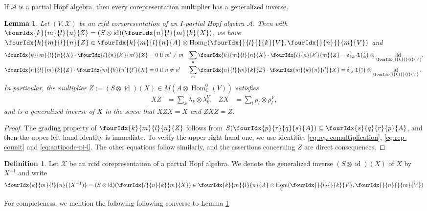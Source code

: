 \documentclass[10pt]{article}
\DeclareMathOperator{\id}{id}
\DeclareMathOperator{\Hom}{Hom}
\newcommand{\C}{\mathbb{C}}
\newcommand{\Grt}[3]{#1{\tiny {\begin{pmatrix} #2\\#3\end{pmatrix}}}}
\newcommand{\UnitC}[2]{\Grt{\mathbf{1}}{#1}{#2}}
\newcommand{\Gr}[5]{\fourIdx{#2}{#4}{#3}{#5}{#1}}%
\newcommand{\Gru}[3]{\Gr{#1}{}{}{#2}{#3}}
\newtheorem{Lem}[Theorem]{Lemma}
\theoremstyle{definition}
\newtheorem{Def}[Theorem]{Definition}
\numberwithin{equation}{section}
\begin{document}
If $\mathscr{A}$ is a partial Hopf algebra,  then every
corepresentation multiplier has a generalized inverse.
\begin{Lem} \label{lemma:rep-invertible}
  Let $(V,\mathscr{X})$ be an rcfd corepresentation of an $I$-partial Hopf
  algebra $\mathscr{A}$. Then with $\Gr{Z}{k}{l}{m}{n} = (S\otimes \id)(\Gr{X}{n}{m}{l}{k})$, we have $\Gr{Z}{k}{l}{m}{n}\in \Gr{A}{k}{l}{m}{n}\otimes \Hom_{\C}(\Gru{V}{l}{k},\Gru{V}{n}{m})$ and
  \begin{align*}
    \Gr{X}{k}{l}{m}{n}  \cdot \Gr{Z}{l}{k'}{n}{m'} &=0 \text{ if } m'\neq m &
      \sum_{n} \Gr{X}{k}{l}{m}{n} \cdot \Gr{Z}{l}{k'}{n}{m} &= \delta_{k,k'}\UnitC{k}{m} \otimes
      \id_{\Gru{V}{k}{l}}, \\
      \Gr{Z}{n}{m}{l}{k}\cdot \Gr{X}{m}{n'}{k}{l'} &= 0
      \text{ if } n\neq n' & 
      \sum_{m} \Gr{Z}{n}{m}{l}{k}\cdot \Gr{X}{m}{n}{k}{l'} &=
      \delta_{l,l'} \UnitC{n}{l} \otimes \id_{\Gru{V}{k}{l}}.
  \end{align*}
  In particular, the multiplier $Z:=     (S \otimes
  \id)(X) \in M(A \otimes \Hom_{\C}^{0}(V))$
  satisfies
  \begin{align} \label{eq:rep-generalized-inverse}
    XZ &= \sum_{k} \lambda_{k} \otimes \lambda^{V}_{k}, &
    ZX &= \sum_{l} \rho_{l} \otimes \rho^{V}_{l},
  \end{align}
  and is a generalized inverse of $X$ in the sense that $XZX=X$ and $ZXZ=Z$.
\end{Lem}
\begin{proof}
  The grading property of $\Gr{Z}{k}{l}{m}{n}$ follows from  $S(\Gr{A}{p}{q}{r}{s})\subseteq \Gr{A}{s}{r}{q}{p}$, and then the upper left hand identity is immediate.  To
  verify the upper right hand one, we use identities \eqref{eq:rep-comultiplication}, \eqref{eq:rep-counit} and \eqref{eq:antipode-pi-l}. The other
equations follow similarly, and the assertions concerning $Z$ are
direct consequences.
\end{proof}
\begin{Def}
  Let $\mathscr{X}$ be an rcfd corepresentation of a  partial Hopf
  algebra.  We  denote the generalized inverse $(S \otimes \id)(X)$
  of $X$  by $X^{-1}$ and write
  \begin{align*}
   \Gr{(X^{-1})}{k}{l}{m}{n}=(S \otimes \id)(\Gr{X}{l}{k}{n}{m}) \in
   \Gr{A}{k}{l}{m}{n} \otimes \Hom_{\C}(\Gru{V}{l}{k},\Gru{V}{n}{m})
  \end{align*}
\end{Def}
For completeness, we mention the following following converse to Lemma \ref{lemma:rep-invertible}
\end{document}
